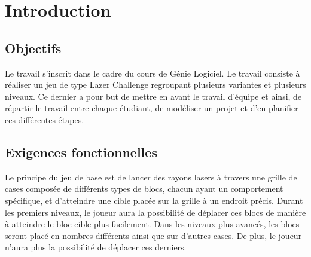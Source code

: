 \documentclass[]{article}
\newcommand{\placeholder}[1]{{\noindent \color{red}[ #1 ]}}
\begin{document}
%
%




\section{Introduction}\label{sec:intro}

\subsection{Objectifs}

Le travail s'inscrit dans le cadre du cours de Génie Logiciel.
Le travail consiste à réaliser un jeu de type Lazer Challenge regroupant plusieurs variantes et plusieurs niveaux.
Ce dernier a pour but de mettre en avant le travail d'équipe et ainsi, de répartir le travail entre chaque étudiant,
de modéliser un projet et d'en planifier ces différentes étapes.


\subsection{Exigences fonctionnelles}

Le principe du jeu de base est de lancer des rayons lasers à travers une grille de cases composée de différents types de blocs, chacun 
ayant un comportement spécifique, et d'atteindre une cible placée sur la grille à un endroit précis. Durant les premiers niveaux, le joueur aura 
la possibilité de déplacer ces blocs de manière à atteindre le bloc cible plus facilement. Dans les niveaux plus avancés, les blocs
seront placé en nombres différents ainsi que sur d'autres cases. De plus, le joueur n'aura plus la possibilité de déplacer ces derniers.
\end{document}

